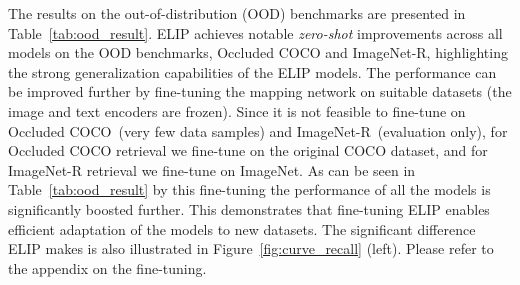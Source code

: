 The results on the out-of-distribution (OOD) benchmarks are presented in Table~\ref{tab:ood_result}. ELIP achieves notable {\em zero-shot} improvements across all models on the OOD benchmarks, Occluded COCO and ImageNet-R, highlighting the strong generalization capabilities of the ELIP models. 
The performance can be improved further by fine-tuning the mapping network on suitable datasets (the image and text encoders are frozen).
Since it is not feasible to fine-tune on Occluded COCO~(very few data samples) and ImageNet-R~(evaluation only),
for Occluded COCO retrieval we fine-tune on the original COCO dataset, and for ImageNet-R retrieval we fine-tune on ImageNet. As can be seen in Table~\ref{tab:ood_result}  by this fine-tuning the performance of all the models is significantly boosted further. This demonstrates that fine-tuning ELIP enables efficient adaptation of the models to new datasets. 
The significant difference ELIP makes is also illustrated in Figure~\ref{fig:curve_recall} (left). 
Please refer to the appendix on the fine-tuning.


